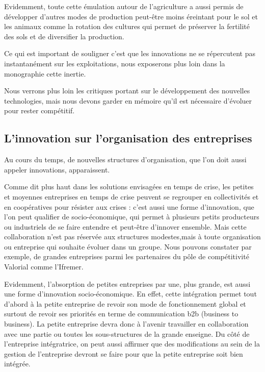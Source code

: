 \documentclass[a4paper,10pt]{report}
\begin{document}
			Evidemment, toute cette émulation autour de l’agriculture a aussi permis de développer d’autres modes de production peut-être moins éreintant pour le sol et les animaux comme la rotation des cultures qui permet de préserver la fertilité des sols et de diversifier la production.
			
			
			Ce qui est important de souligner c’est que les innovations ne se répercutent pas instantanément sur les exploitations, nous exposerons plus loin dans la monographie cette inertie.
			
			Nous verrons plus loin les critiques portant sur le développement des nouvelles technologies, mais nous devons garder en mémoire qu’il est nécessaire d’évoluer pour rester compétitif.
			
			
		\subsection{L'innovation sur l'organisation des entreprises}
			Au cours du temps, de nouvelles structures d’organisation, que l’on doit aussi appeler innovations, apparaissent.
			
			Comme dit plus haut dans les solutions envisagées en temps de crise, les petites et moyennes entreprises en temps de crise peuvent se regrouper en collectivités et en coopératives pour résister aux crises : c’est aussi une forme d’innovation, que l’on peut qualifier de socio-économique, qui permet à plusieurs petits producteurs ou industriels de se faire entendre et peut-être d’innover ensemble. 
			Mais cette collaboration n’est pas réservée aux structures modestes,mais à toute organisation ou entreprise qui souhaite évoluer dans un groupe. Nous pouvons constater par exemple, de grandes entreprises parmi les partenaires du pôle de compétitivité Valorial comme l’Ifremer.
			
			Evidemment, l’absorption de petites entreprises par une, plus grande, est aussi une forme d’innovation socio-économique. En effet, cette intégration permet tout d’abord à la petite entreprise de revoir son mode de fonctionnement global et surtout de revoir ses priorités en terme de communication b2b (business to business). La petite entreprise devra donc à l’avenir travailler en collaboration avec une partie ou toutes les sous-structures de la grande enseigne.
			Du côté de l’entreprise intégratrice, on peut aussi affirmer que des modifications au sein de la gestion de l’entreprise devront se faire pour que la petite entreprise soit bien intégrée. 
			
\end{document}
